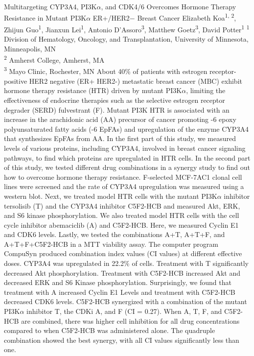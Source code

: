 \makeabstract
{ %
Multitargeting CYP3A4, PI3K\ensuremath{\alpha}, and CDK4/6 Overcomes Hormone Therapy Resistance in Mutant PI3K\ensuremath{\alpha} ER+/HER2\ensuremath{-} Breast Cancer
}
{ %
Elizabeth Koa\textsuperscript{1, 2},
Zhijun Guo\textsuperscript{1}, 
Jianxun Lei\textsuperscript{1}, 
Antonio D'Assoro\textsuperscript{3}, 
Matthew Goetz\textsuperscript{3}, 
David Potter\textsuperscript{1}
}
{ %
\textsuperscript{1} Division of Hematology, Oncology, and Transplantation, University of Minnesota, Minneapolis, MN\\ 
\textsuperscript{2} Amherst College, Amherst, MA\\ 
\textsuperscript{3} Mayo Clinic, Rochester, MN
}
{ %
About 40\% of patients with estrogen receptor-positive HER2 negative (ER+ HER2-) metastatic breast cancer (MBC) exhibit hormone therapy resistance (HTR) driven by mutant PI3K\ensuremath{\alpha}, limiting the effectiveness of endocrine therapies such as the selective estrogen receptor degrader (SERD) fulvestrant (F). Mutant PI3K HTR is associated with an increase in the arachidonic acid (AA) precursor of cancer promoting -6 epoxy polyunsaturated fatty acids (-6 EpFAs) and upregulation of the enzyme CYP3A4 that synthesizes EpFAs from AA. In the first part of this study, we measured levels of various proteins, including CYP3A4, involved in breast cancer signaling pathways, to find which proteins are upregulated in HTR cells. In the second part of this study, we tested different drug combinations in a synergy study to find out how to overcome hormone therapy resistance. 
}
{ %
F-selected MCF-7AC1 clonal cell lines were screened and the rate of CYP3A4 upregulation was measured using a western blot. Next, we treated model HTR cells with the mutant PI3K\ensuremath{\alpha} inhibitor tersolisib (T) and the CYP3A4 inhibitor C5F2-HCB and measured Akt, ERK, and S6 kinase phosphorylation. We also treated model HTR cells with the cell cycle inhibitor abemaciclib (A) and C5F2-HCB. Here, we measured Cyclin E1 and CDK6 levels. Lastly, we tested the combinations A+T, A+T+F, and A+T+F+C5F2-HCB in a MTT viability assay. The computer program CompuSyn produced combination index values (CI values) at different effective doses.
}
{ %
CYP3A4 was upregulated in 22.2\% of cells. Treatment with T significantly decreased Akt phosphorylation. Treatment with C5F2-HCB increased Akt and decreased ERK and S6 Kinase phosphorylation. Surprisingly, we found that treatment with A increased Cyclin E1 Levels and treatment with C5F2-HCB decreased CDK6 levels. C5F2-HCB synergized with a combination of the mutant PI3K\ensuremath{\alpha} inhibitor T, the CDKi A, and F (CI = 0.27). When A, T, F, and C5F2-HCB are combined, there was higher cell inhibition for all drug concentrations compared to when C5F2-HCB was administered alone. The quadruple combination showed the best synergy, with all CI values significantly less than one. 
}
